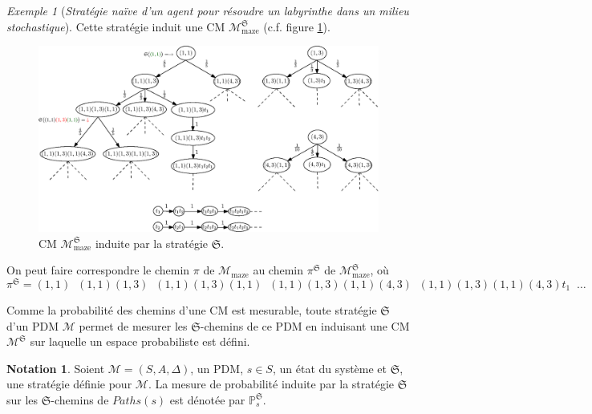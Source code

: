 \documentclass[12pt,a4paper]{report}
\theoremstyle{definition}%
\newtheorem*{notation}{Notation}
\theoremstyle{remark}
\newtheorem{example}{Exemple}[chapter]
\newcommand{\pr}{\mathbb{P}}
\begin{document}
\begin{example}[\textit{Stratégie naïve d'un agent pour résoudre un labyrinthe dans un milieu stochastique}]
	Cette stratégie induit une CM $\mathcal{M}^\mathfrak{S}_{\text{maze}}$
	(c.f. figure \ref{inducted-MC-strat1}).

	\begin{figure}[H]
		\centering
		\captionsetup{justification=centering}
		\includegraphics[scale=0.65]{figures/inductedMC}
		\caption{CM $\mathcal{M}^\mathfrak{S}_{\text{maze}}$ induite par la
			stratégie $\mathfrak{S}$.}
		\label{inducted-MC-strat1}
	\end{figure}

	On peut faire correspondre le chemin $\pi$ de
	$\mathcal{M}_{\text{maze}}$ au chemin $\pi^\mathfrak{S}$
	de $\mathcal{M}^\mathfrak{S}_{\text{maze}}$, où
	\[
		\pi^\mathfrak{S} = (1, 1) \; \; (1, 1) (1, 3) \; \;
		(1, 1) (1, 3) (1, 1) \; \;
		(1, 1) (1, 3) (1, 1) (4, 3) \; \;
		(1, 1) (1, 3) (1, 1) (4, 3) t_1 \; \; \dots
	\]
\end{example}

Comme la probabilité des chemins d'une CM est mesurable, toute stratégie
$\mathfrak{S}$ d'un PDM $\mathcal{M}$ permet de mesurer les $\mathfrak{S}$-chemins de ce PDM
en induisant une CM $\mathcal{M}^\mathfrak{S}$ sur laquelle un espace probabiliste
est défini.
\begin{notation}
	Soient $\mathcal{M} = (S, A, \Delta)$, un PDM, $s \in S$, un état du système et
	$\mathfrak{S}$, une stratégie définie pour $\mathcal{M}$.
	La mesure de probabilité induite par la stratégie $\mathfrak{S}$ sur les
	$\mathfrak{S}$-chemins de $Paths(s)$ est dénotée par $\pr^\mathfrak{S}_s$.
\end{notation}
\end{document}
